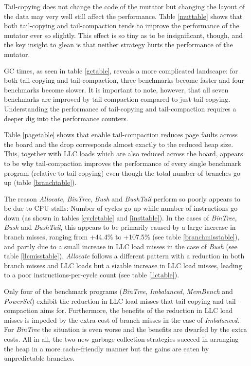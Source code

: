 \documentclass[a4paper,oneside]{memoir}
\begin{document}
Tail-copying does not change the code of the mutator but changing the layout of
the data may very well still affect the performance. Table \ref{muttable} shows
that both tail-copying and tail-compaction tends to improve the performance
of the mutator ever so slightly. This effect is so tiny as to be insignificant,
though, and the key insight to glean is that neither strategy hurts the performance
of the mutator.

GC times, as seen in table \ref{gctable}, reveals a more complicated landscape:
for both tail-copying and tail-compaction, three benchmarks become faster and
four benchmarks become slower. It is important to note, however, that all seven
benchmarks are improved by tail-compaction compared to just tail-copying.
Understanding the performance of tail-copying and tail-compaction requires a
deeper dig into the performance counters.

Table \ref{pagetable} shows that enable tail-compaction reduces page faults
across the board and the drop corresponds almost exactly to the reduced heap
size. This, together with LLC loads which are also reduced across the board,
appears to be why tail-compaction improves the performance of every single
benchmark program (relative to tail-copying) even though the total number of
branches go up (table \ref{branchtable}).

The reason \emph{Allocate}, \emph{BinTree}, \emph{Bush} and \emph{BushTail}
perform so poorly appears to be due to CPU stalls: Number of cycles go up
while number of instructions go down (as shown in tables \ref{cycletable} and
\ref{insttable}). In the cases of \emph{BinTree}, \emph{Bush} and
\emph{BushTail}, this appears to be primarily caused by a large increase in
branch misses, ranging from +44.4\% to +107.5\% (see table \ref{branchmisstable}),
and partly due to a small increase in LLC load misses in the case of \emph{Bush}
(see table \ref{llcmisstable}). \emph{Allocate} follows a different pattern
with a reduction in both branch misses and LLC loads but a sizable increase in
LLC load misses, leading to a poor instructions-per-cycle count (see table
\ref{llctable}).

Only four of the benchmark programs (\emph{BinTree}, \emph{Imbalanced},
\emph{MemBench} and \emph{PowerSet}) exhibit the reduction in LLC load misses
that tail-copying and tail-compaction aims for. Furthermore, the benefits of
the reduction in LLC load misses is impeded by the extra cost of branch misses
in the case of \emph{Imbalanced}. For \emph{BinTree} the situation is even worse
and the benefits are dwarfed by the extra costs. All in all, the two new
garbage collection strategies succeed in arranging the heap in a more
cache-friendly manner but the gains are eaten by unpredictable branches.
\end{document}
